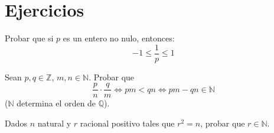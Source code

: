\section{Ejercicios}
\begin{ejercicio}
    Probar que si $p$ es un entero no nulo, entonces:
    \begin{equation*}
        -1 \leq \frac{1}{p} \leq 1 
    \end{equation*}
\end{ejercicio}

\begin{ejercicio}
    Sean $p,q \in \mathbb{Z}$, $m,n \in \mathbb{N}$. Probar que
    \begin{equation*}
        \frac{p}{n} \cdot \frac{q}{m} \Leftrightarrow pm < qn \Leftrightarrow pm - qn \in \mathbb{N}
    \end{equation*}
    ($\mathbb{N}$ determina el orden de $\mathbb{Q}$).
\end{ejercicio}

\begin{ejercicio}
    Dados $n$ natural y $r$ racional positivo tales que $r^2=n$, probar que $r \in \mathbb{N}$.
\end{ejercicio}